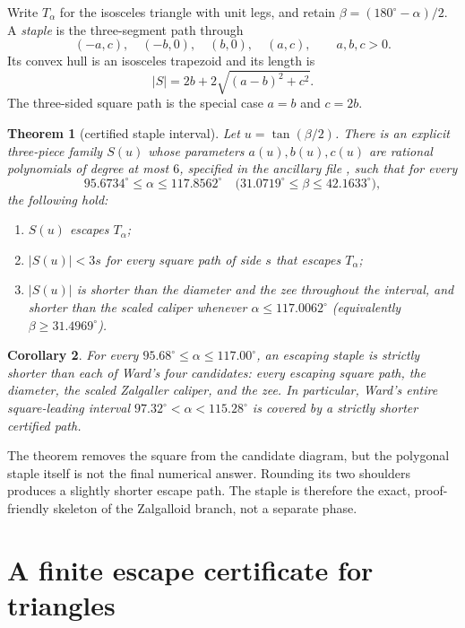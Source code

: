 \documentclass[11pt]{amsart}
\newtheorem{theorem}{Theorem}[section]
\newtheorem{corollary}[theorem]{Corollary}
\theoremstyle{remark}
\begin{document}
Write $T_\alpha$ for the isosceles triangle with unit legs, and retain
$\beta=(180^\circ-\alpha)/2$.  A \emph{staple} is the three-segment path
through
\[
 (-a,c),\quad(-b,0),\quad(b,0),\quad(a,c),
 \qquad a,b,c>0.
\]
Its convex hull is an isosceles trapezoid and its length is
\[
 |S|=2b+2\sqrt{(a-b)^2+c^2}.
\]
The three-sided square path is the special case $a=b$ and $c=2b$.

\begin{theorem}[certified staple interval]\label{thm:staple}
Let $u=\tan(\beta/2)$.  There is an explicit three-piece family
$S(u)$ whose parameters $a(u),b(u),c(u)$ are rational polynomials of
degree at most $6$, specified in the ancillary file
, such that for every
\[
 95.6734^\circ\le\alpha\le117.8562^\circ
 \quad
 \bigl(31.0719^\circ\le\beta\le42.1633^\circ\bigr),
\]
the following hold:
\begin{enumerate}
\item $S(u)$ escapes $T_\alpha$;
\item $|S(u)|<3s$ for every square path of side $s$ that escapes
      $T_\alpha$;
\item $|S(u)|$ is shorter than the diameter and the zee throughout the
      interval, and shorter than the scaled caliper whenever
      $\alpha\le117.0062^\circ$ (equivalently
      $\beta\ge31.4969^\circ$).
\end{enumerate}
\end{theorem}

\begin{corollary}\label{cor:ward}
For every
$95.68^\circ\le\alpha\le117.00^\circ$, an escaping staple is strictly
shorter than each of Ward's four candidates: every escaping square path,
the diameter, the scaled Zalgaller caliper, and the zee.  In particular,
Ward's entire square-leading interval
$97.32^\circ<\alpha<115.28^\circ$ is covered by a strictly shorter certified
path.
\end{corollary}

The theorem removes the square from the candidate diagram, but the polygonal
staple itself is not the final numerical answer.  Rounding its two shoulders
produces a slightly shorter escape path.  The staple is therefore the exact,
proof-friendly skeleton of the Zalgalloid branch, not a separate phase.

\section{A finite escape certificate for triangles}\label{sec:criterion}
\end{document}
